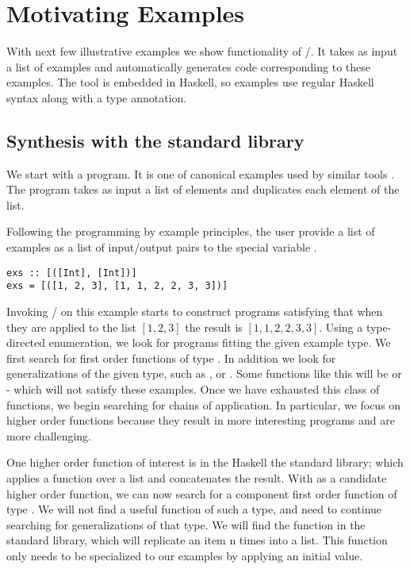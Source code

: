 \section{Motivating Examples} 
\label{examples}

With next few illustrative examples we show functionality of \ourTool/.
It takes as input a list of examples and automatically generates code
corresponding to these examples. The tool is embedded in Haskell, so examples use regular Haskell syntax along with a type annotation.



\subsection{Synthesis with the standard library}

We start with a  program. It is one of canonical 
examples used by similar tools \cite{Osera:2016}. The  program takes as input a list of elements and duplicates each element 
of the list.
 
Following the programming by example principles, the user 
provide a list of examples as a list of input/output pairs to the special variable .

\begin{lstlisting}
exs :: [([Int], [Int])]
exs = [([1, 2, 3], [1, 1, 2, 2, 3, 3])]
\end{lstlisting}

Invoking \ourTool/ on this example starts to construct programs  satisfying that when they are applied to the list $[1, 2, 3]$ the result 
is $[1, 1, 2, 2, 3, 3]$.
Using a type-directed enumeration, we look for programs fitting the given example type.
We first search for first order functions of type \codeinline{[Int]->[Int]}.
In addition we look for generalizations of the given type, such as \codeinline{[a]->[a]}, or .
Some functions like this will be  or  - which will not satisfy these examples.
Once we have exhausted this class of functions, we begin searching for chains of application.
In particular, we focus on higher order functions because they result in more interesting programs and are more challenging.

One higher order function of interest is in the Haskell the standard library;  which applies a function over a list and concatenates the result.
With  as a candidate higher order function, we can now search for a component first order function of type .
We will not find a useful function of such a type, and need to continue searching for generalizations of that type.
We will find the function  in the standard library, which will replicate an item n times into a list.
This function only needs to be specialized to our examples by applying an initial value.

